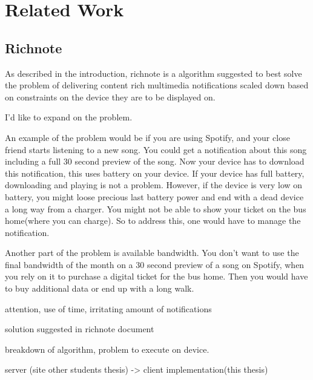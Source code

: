 
\chapter{Related Work} %
\label{Chapter2}

\section{Richnote} 
As described in the introduction, richnote\cite{Richnote} is a algorithm suggested to best solve the problem of delivering content rich multimedia notifications scaled down based on constraints on the device they are to be displayed on.

I'd like to expand on the problem.

An example of the problem would be if you are using Spotify, and your close friend starts listening to a new song. You could get a notification about this song including a full 30 second preview of the song. Now your device has to download this notification, this uses battery on your device. If your device has full battery, downloading and playing is not a problem. However, if the device is very low on battery, you might loose precious last battery power and end with a dead device a long way from a charger. You might not be able to show your ticket on the bus home(where you can charge). So to address this, one would have to manage the notification. 

Another part of the problem is available bandwidth. You don't want to use the final bandwidth of the month on a 30 second preview of a song on Spotify, when you rely on it to purchase a digital ticket for the bus home. Then you would have to buy additional data or end up with a long walk.

attention, use of time, irritating amount of notifications

solution suggested in richnote document

breakdown of algorithm, problem to execute on device.

server (site other students thesis) -> client implementation(this thesis)